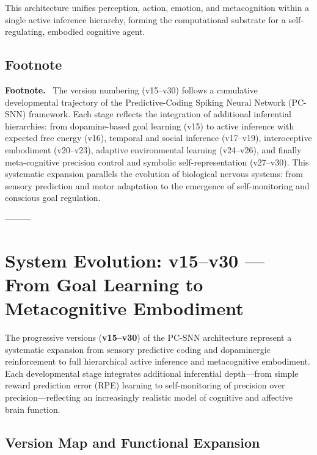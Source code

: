 \documentclass[9pt]{elife}
\begin{document}
This architecture unifies perception, action, emotion, and metacognition within a single active inference hierarchy, forming the computational substrate for a self-regulating, embodied cognitive agent.

\subsection*{Footnote}

\footnotesize
\noindent
\textbf{Footnote.}~
The version numbering (v15–v30) follows a cumulative developmental trajectory of the
Predictive-Coding Spiking Neural Network (PC-SNN) framework.  
Each stage reflects the integration of additional inferential hierarchies:
from dopamine-based goal learning (v15) to active inference with expected free energy (v16),
temporal and social inference (v17–v19),
interoceptive embodiment (v20–v23),
adaptive environmental learning (v24–v26),
and finally meta-cognitive precision control and symbolic self-representation (v27–v30).
This systematic expansion parallels the evolution of biological nervous systems:
from sensory prediction and motor adaptation to the emergence of self-monitoring and conscious goal regulation.
\normalsize

---------

\section{System Evolution: v15–v30 — From Goal Learning to Metacognitive Embodiment}

The progressive versions (\textbf{v15–v30}) of the PC-SNN architecture represent a systematic expansion from sensory predictive coding and dopaminergic reinforcement to full hierarchical active inference and metacognitive embodiment. Each developmental stage integrates additional inferential depth—from simple reward prediction error (RPE) learning to self-monitoring of precision over precision—reflecting an increasingly realistic model of cognitive and affective brain function.

\subsection{Version Map and Functional Expansion}
\end{document}
